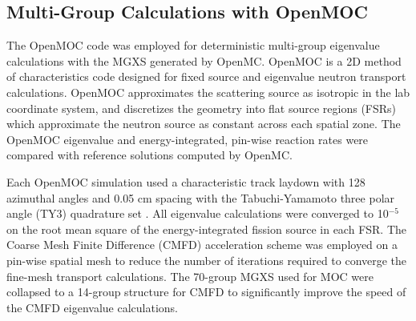\subsection{Multi-Group Calculations with OpenMOC}
\label{subsec:openmoc}

The OpenMOC code was employed for deterministic multi-group eigenvalue calculations with the MGXS generated by OpenMC. OpenMOC is a 2D method of characteristics code designed for fixed source and eigenvalue neutron transport calculations. OpenMOC approximates the scattering source as isotropic in the lab coordinate system, and discretizes the geometry into flat source regions (FSRs) which approximate the neutron source as constant across each spatial zone. The OpenMOC eigenvalue and energy-integrated, pin-wise reaction rates were compared with reference solutions computed by OpenMC.

Each OpenMOC simulation used a characteristic track laydown with 128 azimuthal angles and 0.05 cm spacing with the Tabuchi-Yamamoto three polar angle (TY3) quadrature set \citep{yamamoto2007}. All eigenvalue calculations were converged to 10$^{-5}$ on the root mean square of the energy-integrated fission source in each FSR. The Coarse Mesh Finite Difference (CMFD) acceleration scheme was employed on a pin-wise spatial mesh to reduce the number of iterations required to converge the fine-mesh transport calculations. The 70-group MGXS used for MOC were collapsed to a 14-group structure for CMFD to significantly improve the speed of the CMFD eigenvalue calculations.
